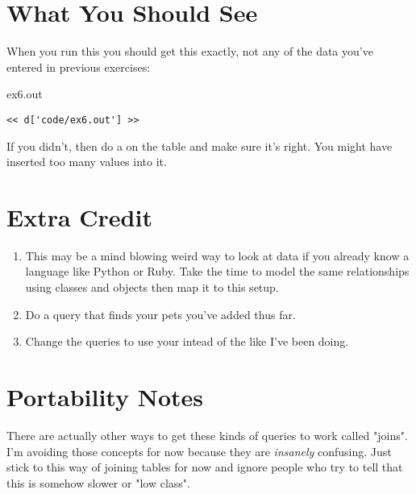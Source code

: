 \section{What You Should See}

When you run this you should get this exactly, not any of the data you've
entered in previous exercises:

\begin{code}{ex6.out}
\begin{Verbatim}
<< d['code/ex6.out'] >>
\end{Verbatim}
\end{code}

If you didn't, then do a  on the  table and
make sure it's right.  You might have inserted too many values into it.


\section{Extra Credit}

\begin{enumerate}
\item This may be a mind blowing weird way to look at data if you already know
    a language like Python or Ruby.  Take the time to model the same relationships
    using classes and objects then map it to this setup.
\item Do a query that finds your pets you've added thus far.
\item Change the queries to use your  intead of the 
     like I've been doing.
\end{enumerate}

\section{Portability Notes}

There are actually other ways to get these kinds of queries to work called
"joins".  I'm avoiding those concepts for now because they are \emph{insanely}
confusing.  Just stick to this way of joining tables for now and ignore people
who try to tell that this is somehow slower or "low class".


